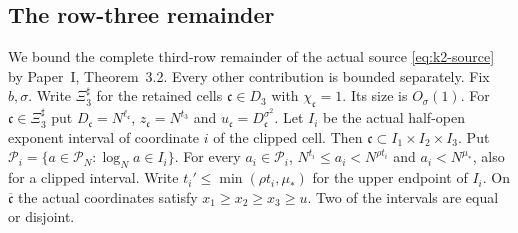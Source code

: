 \subsection{The row-three remainder}\label{subsec:k2-row3}

We bound the complete third-row remainder of the actual source
\eqref{eq:k2-source} by Paper~I, Theorem~3.2. Every other contribution is
bounded separately. Fix \(b,\sigma\). Write \(\Xi^{\sharp}_3\) for the
retained cells \(\mathfrak c\in D_3\) with \(\chi_{\mathfrak c}=1\). Its
size is \(O_\sigma(1)\). For \(\mathfrak c\in\Xi^{\sharp}_3\) put
\(D_{\mathfrak c}=N^{\ell_{\mathfrak c}}\), \(z_{\mathfrak c}=N^{t_3}\) and
\(u_{\mathfrak c}=D_{\mathfrak c}^{\sigma^2}\). Let \(I_i\) be the actual
half-open exponent interval of coordinate \(i\) of the clipped cell. Then
\(\mathfrak c\subset I_1\times I_2\times I_3\). Put
\(\mathcal P_i=\{a\in\mathcal P_N:\log_Na\in I_i\}\). For every
\(a_i\in\mathcal P_i\), \(N^{t_i}\le a_i<N^{\rho t_i}\) and \(a_i<N^{\mu_*}\),
also for a clipped interval. Write \(t_i'\le\min(\rho t_i,\mu_*)\) for the
upper endpoint of \(I_i\). On \(\overline{\mathfrak c}\) the actual
coordinates satisfy \(x_1\ge x_2\ge x_3\ge u\). Two of the intervals are
equal or disjoint.

